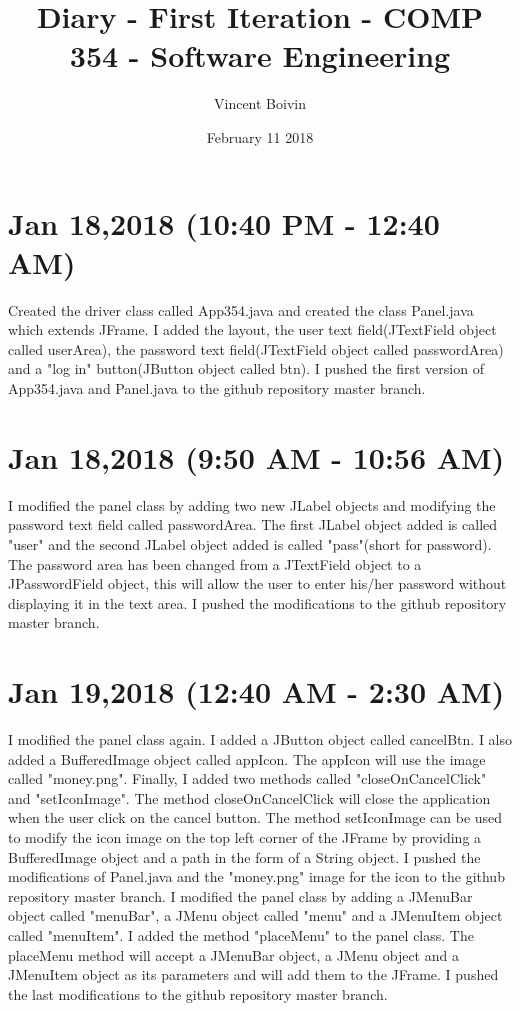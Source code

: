 \documentclass{article}
\title{Diary - First Iteration - COMP 354 - Software Engineering}
\author{Vincent Boivin}
\date{February 11 2018}
\begin{document}
\maketitle
\section{Jan 18,2018 (10:40 PM - 12:40 AM)} 
Created the driver class called App354.java and created the class Panel.java which extends JFrame. I added the layout, the user text field(JTextField object called userArea), the password text field(JTextField object called passwordArea) and a "log in" button(JButton object called btn). I pushed the first version of App354.java and Panel.java to the github repository master branch.
\section{Jan 18,2018 (9:50 AM - 10:56 AM)}
I modified the panel class by adding two new JLabel objects and modifying the password text field called passwordArea. The first JLabel object added is called "user" and the second JLabel object added is called "pass"(short for password). The password area has been changed from a JTextField object to a JPasswordField object, this will allow the user to enter his/her password without displaying it in the text area. I pushed the modifications to the github repository master branch.
\section{Jan 19,2018 (12:40 AM - 2:30 AM)}
I modified the panel class again. I added a JButton object called cancelBtn. I also added a BufferedImage object called appIcon. The appIcon will use the image called "money.png". Finally, I added two methods called "closeOnCancelClick" and "setIconImage". The method closeOnCancelClick will close the application when the user click on the cancel button. The method setIconImage can be used to modify the icon image on the top left corner of the JFrame by providing a BufferedImage object and a path in the form of a String object. I pushed the modifications of Panel.java and the "money.png" image for the icon to the github repository master branch. I modified the panel class by adding a JMenuBar object called "menuBar", a JMenu object called "menu" and a JMenuItem object called "menuItem". I added the method "placeMenu" to the panel class. The placeMenu method will accept a JMenuBar object, a JMenu object and a JMenuItem object as its parameters and will add them to the JFrame. I pushed the last modifications to the github repository master branch.    
\end{document}
